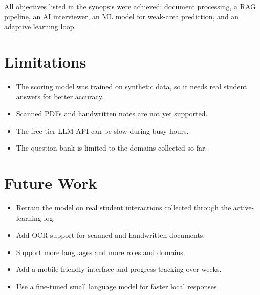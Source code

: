 \documentclass[11pt,a4paper]{report}
\begin{document}
All objectives listed in the synopsis were achieved: document processing, a RAG pipeline, an AI interviewer, an ML model for weak-area prediction, and an adaptive learning loop.

\section{Limitations}
\begin{itemize}
  \item The scoring model was trained on synthetic data, so it needs real student answers for better accuracy.
  \item Scanned PDFs and handwritten notes are not yet supported.
  \item The free-tier LLM API can be slow during busy hours.
  \item The question bank is limited to the domains collected so far.
\end{itemize}

\section{Future Work}
\begin{itemize}
  \item Retrain the model on real student interactions collected through the active-learning log.
  \item Add OCR support for scanned and handwritten documents.
  \item Support more languages and more roles and domains.
  \item Add a mobile-friendly interface and progress tracking over weeks.
  \item Use a fine-tuned small language model for faster local responses.
\end{itemize}

\end{document}

